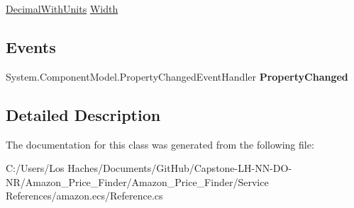 \begin{DoxyCompactItemize}
\begin{DoxyCompactList}\small\item\em \end{DoxyCompactList}\item 
\hypertarget{class_amazon___price___finder_1_1amazon_1_1ecs_1_1_item_attributes_package_dimensions_a28c92fa4c72e3517d2b17c092b5cd6f0}{\hyperlink{class_amazon___price___finder_1_1amazon_1_1ecs_1_1_decimal_with_units}{Decimal\-With\-Units} \hyperlink{class_amazon___price___finder_1_1amazon_1_1ecs_1_1_item_attributes_package_dimensions_a28c92fa4c72e3517d2b17c092b5cd6f0}{Width}}\label{class_amazon___price___finder_1_1amazon_1_1ecs_1_1_item_attributes_package_dimensions_a28c92fa4c72e3517d2b17c092b5cd6f0}

\begin{DoxyCompactList}\small\item\em \end{DoxyCompactList}\end{DoxyCompactItemize}
\subsection*{Events}
\begin{DoxyCompactItemize}
\item 
\hypertarget{class_amazon___price___finder_1_1amazon_1_1ecs_1_1_item_attributes_package_dimensions_ae9081b477724ee7c0a615472abc5f96c}{System.\-Component\-Model.\-Property\-Changed\-Event\-Handler {\bfseries Property\-Changed}}\label{class_amazon___price___finder_1_1amazon_1_1ecs_1_1_item_attributes_package_dimensions_ae9081b477724ee7c0a615472abc5f96c}

\end{DoxyCompactItemize}


\subsection{Detailed Description}


The documentation for this class was generated from the following file\-:\begin{DoxyCompactItemize}
\item 
C\-:/\-Users/\-Los Haches/\-Documents/\-Git\-Hub/\-Capstone-\/\-L\-H-\/\-N\-N-\/\-D\-O-\/\-N\-R/\-Amazon\-\_\-\-Price\-\_\-\-Finder/\-Amazon\-\_\-\-Price\-\_\-\-Finder/\-Service References/amazon.\-ecs/Reference.\-cs\end{DoxyCompactItemize}
